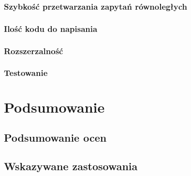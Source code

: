 \documentclass[12pt]{report}
\begin{document}
    \subsection{Szybkość przetwarzania zapytań równoległych}
    \subsection{Ilość kodu do napisania}
    \subsection{Rozszerzalność}
    \subsection{Testowanie}

\chapter{Podsumowanie}
  \section{Podsumowanie ocen}
  \section{Wskazywane zastosowania}

\end{document}
